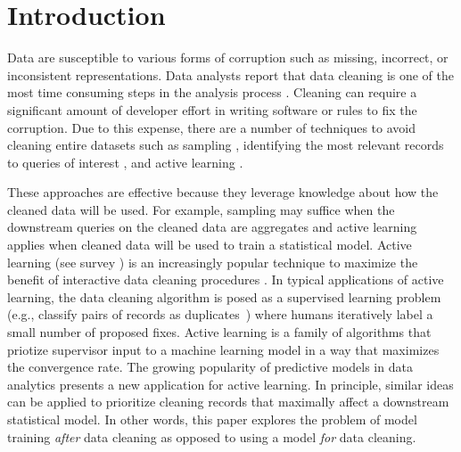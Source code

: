 \section{Introduction}
Data are susceptible to various forms of corruption such as missing, incorrect, or inconsistent representations.
Data analysts report that data cleaning is one of the most time consuming steps in the analysis process \cite{nytimes}.
Cleaning can require a significant amount of developer effort in writing software or rules to fix the corruption.
Due to this expense, there are a number of techniques to avoid cleaning entire datasets such as sampling \cite{wang1999sample}, identifying the most relevant records to queries of interest \cite{DBLP:conf/sigmod/BergmanMNT15}, and active learning \cite{gokhale2014corleone}.

These approaches are effective because they leverage knowledge about how the cleaned data will be used. 
For example, sampling may suffice when the downstream queries on the cleaned data are aggregates and active learning applies when cleaned data will be used to train a statistical model.
Active learning (see survey \cite{settles2010active}) is an increasingly popular technique to maximize the benefit of interactive data cleaning procedures \cite{DBLP:journals/pvldb/YakoutENOI11, gokhale2014corleone, yakout2013don, DBLP:journals/pvldb/HaasKWF015}.
In typical applications of active learning, the data cleaning algorithm is posed as a supervised learning problem (e.g., classify pairs of records as duplicates~\cite{gokhale2014corleone}) where humans iteratively label a small number of proposed fixes.
Active learning is a family of algorithms that priotize supervisor input to a machine learning model in a way that maximizes the convergence rate.
The growing popularity of predictive models in data analytics \cite{bdas, alexandrov2014stratosphere, crotty2014tupleware, hellerstein2012madlib} presents a new application for active learning.
In principle, similar ideas can be applied to prioritize cleaning records that maximally affect a downstream statistical model.
In other words, this paper explores the problem of model training \emph{after} data cleaning as opposed to using a model \emph{for} data cleaning.

